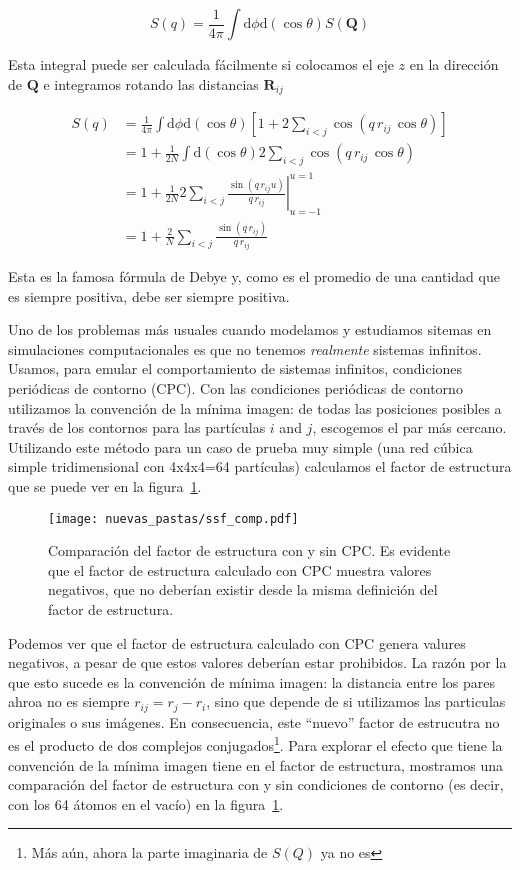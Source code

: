 \begin{equation*}
  S(q) = \frac{1}{4\pi}\int\text{d}\phi\text{d}(\cos\theta) S(\mathbf{Q})
\end{equation*}

Esta integral puede ser calculada fácilmente si colocamos el eje $z$ en la dirección de $\mathbf{Q}$ e integramos rotando las distancias $\mathbf{R}_{ij}$

\begin{align*}
  S(q) &= \frac{1}{4\pi}\int\text{d}\phi\text{d}(\cos\theta)
  \left[1 + 2\sum_{i < j}\cos\left(q\,r_{ij}\,\cos\theta\right)\right]\\
  &= 1 + \frac{1}{2N}\int\text{d}(\cos\theta)
  2\sum_{i < j}\cos\left(q\,r_{ij}\,\cos\theta\right)\\
  &= 1 + \frac{1}{2N} 2 \sum_{i < j} \left.\frac{\sin(q\,r_{ij}u)}{q\,r_{ij}}\right|_{u=-1}^{u=1}\\
  &= 1 + \frac{2}{N} \sum_{i < j}\frac{\sin(q\,r_{ij})}{q\,r_{ij}}
\end{align*}

Esta es la famosa fórmula de Debye y, como es el promedio de una cantidad que es siempre positiva, debe ser siempre positiva.

Uno de los problemas más usuales cuando modelamos y estudiamos sitemas en simulaciones computacionales es que no tenemos \emph{realmente} sistemas infinitos.
Usamos, para emular el comportamiento de sistemas infinitos, condiciones periódicas de contorno (CPC).
Con las condiciones periódicas de contorno utilizamos la convención de la mínima imagen: de todas las posiciones posibles a través de los contornos para las partículas $i$ and $j$, escogemos el par más cercano.
Utilizando este método para un caso de prueba muy simple (una red cúbica simple tridimensional con 4x4x4=64 partículas) calculamos el factor de estructura que se puede ver en la figura~\ref{fig:ssf_comp}.

\begin{figure}
  \centering
  \texttt{[image: nuevas\_pastas/ssf\_comp.pdf]}
  \caption{Comparación del factor de estructura con y sin CPC.
    Es evidente que el factor de estructura calculado con CPC muestra valores negativos, que no deberían existir desde la misma definición del factor de estructura.}
  \label{fig:ssf_comp}
\end{figure}

Podemos ver que el factor de estructura calculado con CPC genera valures negativos, a pesar de que estos valores deberían estar prohibidos.
La razón por la que esto sucede es la convención de mínima imagen: la distancia entre los pares ahroa no es siempre $r_{ij} = r_j - r_i$, sino que depende de si utilizamos las particulas originales o sus imágenes.
En consecuencia, este ``nuevo'' factor de estrucutra no es el producto de dos complejos conjugados\footnote{Más aún, ahora la parte imaginaria de $S(Q)$ ya no es}.
Para explorar el efecto que tiene la convención de la mínima imagen tiene en el factor de estructura, mostramos una comparación del factor de estructura con y sin condiciones de contorno (es decir, con los 64 átomos en el vacío) en la figura~\ref{fig:ssf_comp}.

